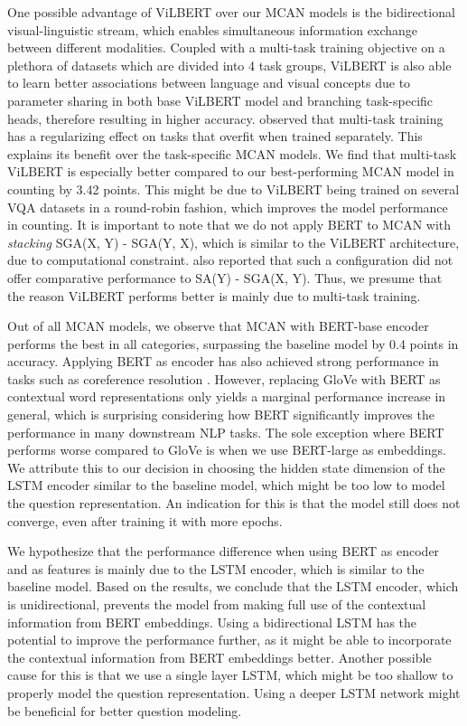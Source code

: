 \documentclass{article}
\begin{document}
One possible advantage of ViLBERT over our MCAN models is the bidirectional visual-linguistic stream, which enables simultaneous information exchange between different modalities. Coupled with a multi-task training objective on a plethora of datasets which are divided into 4 task groups, ViLBERT is also able to learn better associations between language and visual concepts due to parameter sharing in both base ViLBERT model and branching task-specific heads, therefore resulting in higher accuracy. \citet{lu2020multitask} observed that multi-task training has a regularizing effect on tasks that overfit when trained separately. This explains its benefit over the task-specific MCAN models. We find that multi-task ViLBERT is especially better compared to our best-performing MCAN model in counting by 3.42 points. This might be due to ViLBERT being trained on several VQA datasets in a round-robin fashion, which improves the model performance in counting. It is important to note that we do not apply BERT to MCAN with \textit{stacking} SGA(X, Y) - SGA(Y, X), which is similar to the ViLBERT architecture, due to computational constraint. \citet{yu2019mcan} also reported that such a configuration did not offer comparative performance to SA(Y) - SGA(X, Y). Thus, we presume that the reason ViLBERT performs better is mainly due to multi-task training.

Out of all MCAN models, we observe that MCAN with BERT-base encoder performs the best in all categories, surpassing the baseline model by 0.4 points in accuracy. Applying BERT as encoder has also achieved strong performance in tasks such as coreference resolution \citep{joshi-etal-2019-bert}. However, replacing GloVe with BERT as contextual word representations only yields a marginal performance increase in general, which is surprising considering how BERT significantly improves the performance in many downstream NLP tasks. The sole exception where BERT performs worse compared to GloVe is when we use BERT-large as embeddings. We attribute this to our decision in choosing the hidden state dimension of the LSTM encoder similar to the baseline model, which might be too low to model the question representation. An indication for this is that the model still does not converge, even after training it with more epochs. 

We hypothesize that the performance difference when using BERT as encoder and as features is mainly due to the LSTM encoder, which is similar to the baseline model. Based on the results, we conclude that the LSTM encoder, which is unidirectional, prevents the model from making full use of the contextual information from BERT embeddings. Using a bidirectional LSTM has the potential to improve the performance further, as it might be able to incorporate the contextual information from BERT embeddings better. Another possible cause for this is that we use a single layer LSTM, which might be too shallow to properly model the question representation. Using a deeper LSTM network might be beneficial for better question modeling.
\end{document}
